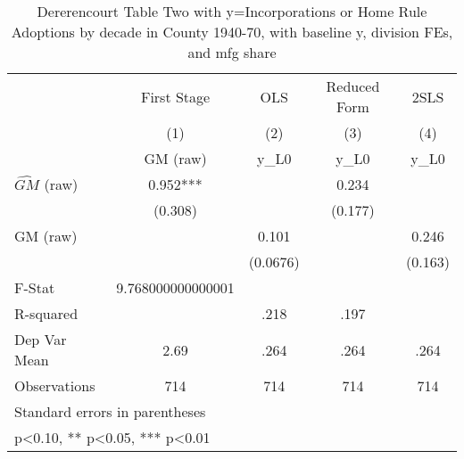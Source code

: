 \begin{table}[htbp]\centering
\def\sym#1{\ifmmode^{#1}\else\(^{#1}\)\fi}
\caption{Dererencourt Table Two with y=Incorporations or Home Rule Adoptions by decade in County 1940-70, with baseline y, division FEs, and mfg share}
\begin{tabular}{l*{4}{c}}
\toprule
                    & First Stage   &         OLS   &Reduced Form   &        2SLS   \\
                    &\multicolumn{1}{c}{(1)}&\multicolumn{1}{c}{(2)}&\multicolumn{1}{c}{(3)}&\multicolumn{1}{c}{(4)}\\
                    &\multicolumn{1}{c}{GM  (raw)}&\multicolumn{1}{c}{y\_L0}&\multicolumn{1}{c}{y\_L0}&\multicolumn{1}{c}{y\_L0}\\
\midrule
$\hat{GM}$ (raw)    &       0.952***&               &       0.234   &               \\
                    &     (0.308)   &               &     (0.177)   &               \\
\addlinespace
GM  (raw)           &               &       0.101   &               &       0.246   \\
                    &               &    (0.0676)   &               &     (0.163)   \\
\midrule
F-Stat              &9.768000000000001   &               &               &               \\
R-squared           &               &        .218   &        .197   &               \\
Dep Var Mean        &        2.69   &        .264   &        .264   &        .264   \\
Observations        &         714   &         714   &         714   &         714   \\
\bottomrule
\multicolumn{5}{l}{\footnotesize Standard errors in parentheses}\\
\multicolumn{5}{l}{\footnotesize * p<0.10, ** p<0.05, *** p<0.01}\\
\end{tabular}
\end{table}
